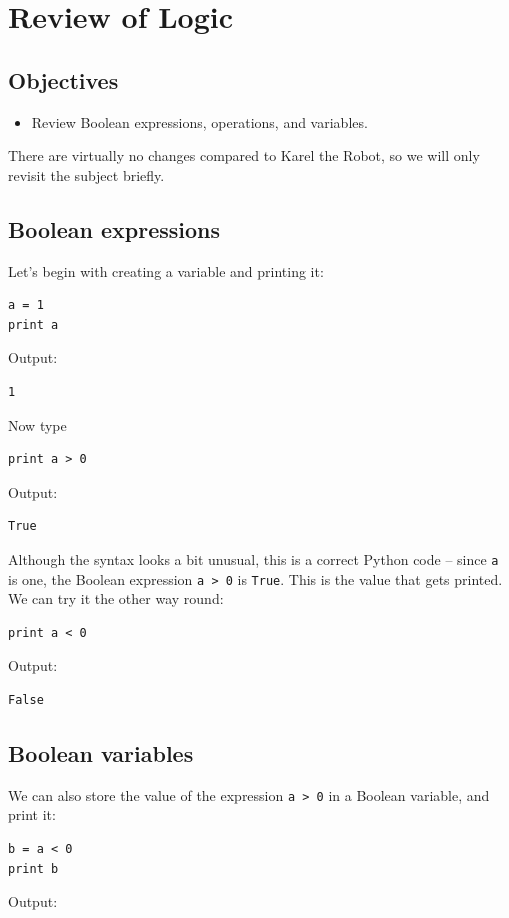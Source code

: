 \section{Review of Logic}

\subsection{Objectives}

\begin{itemize}
\item Review Boolean expressions, operations, and variables.
\end{itemize}
There are virtually no changes compared to Karel the Robot, so we will 
only revisit the subject briefly. 

\subsection{Boolean expressions}

Let's begin with creating a variable 
and printing it:

\begin{verbatim}
a = 1
print a
\end{verbatim}
Output:

\begin{verbatim}
1
\end{verbatim}
Now type

\begin{verbatim}
print a > 0
\end{verbatim}
Output:

\begin{verbatim}
True
\end{verbatim}
Although the syntax looks a bit unusual, this is a correct
Python code -- since {\tt a} is one, the Boolean expression {\tt a > 0}
is {\tt True}. This is the value that gets printed. We can try it the other 
way round:

\begin{verbatim}
print a < 0
\end{verbatim}
Output:

\begin{verbatim}
False
\end{verbatim}

\subsection{Boolean variables}

We can also store the value of the expression {\tt a > 0} in a Boolean variable,
and print it:
\begin{verbatim}
b = a < 0
print b
\end{verbatim}
Output:

